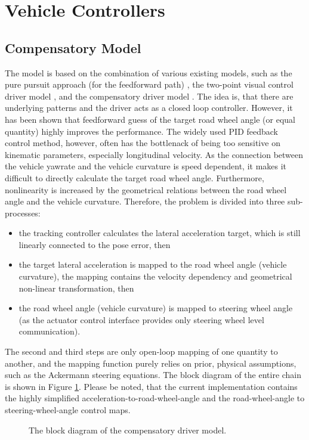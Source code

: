 \documentclass[sn-mathphys-num]{sn-jnl}%
\begin{document}
\section{Vehicle Controllers} \label{sec:vehicle_controllers}
\subsection{Compensatory Model} \label{sec:compensatory_model}
The model is based on the combination of various existing models, such as the pure pursuit approach (for the feedforward path) \cite{NovelPP} \cite{MultGoalPP}, the two-point visual control driver model \cite{TwoPoint},
and the compensatory driver model \cite{ContrTheoMod}. The idea is, that there are underlying patterns and the driver acts as a closed loop controller. However, it has been shown that feedforward guess of the target 
road wheel angle (or equal quantity) highly improves the performance. The widely used PID feedback control method, however, often has the bottlenack of being too sensitive on kinematic parameters, especially longitudinal 
velocity. As the connection between the vehicle yawrate and the vehicle curvature is speed dependent, it makes it difficult to directly calculate the target road wheel angle. Furthermore, nonlinearity is increased by 
the geometrical relations between the road wheel angle and the vehicle curvature. Therefore, the problem is divided into three sub-processes:
\begin{itemize}
    \item the tracking controller calculates the lateral acceleration target, which is still linearly connected to the pose error, then
    \item the target lateral acceleration is mapped to the road wheel angle (vehicle curvature), the mapping contains the velocity dependency and geometrical non-linear transformation, then
    \item the road wheel angle (vehicle curvature) is mapped to steering wheel angle (as the actuator control interface provides only steering wheel level communication).
\end{itemize}
The second and third steps are only open-loop mapping of one quantity to another, and the mapping function purely relies on prior, physical assumptions, such as the Ackermann steering equations.
The block diagram of the entire chain is shown in Figure \ref{fig:compensatory_arch}. Please be noted, that the current implementation contains the highly simplified acceleration-to-road-wheel-angle and the road-wheel-angle to 
steering-wheel-angle control maps. 

\begin{figure}[h]
    \caption{The block diagram of the compensatory driver model.}
    \label{fig:compensatory_arch}
\end{figure}


\end{document}
